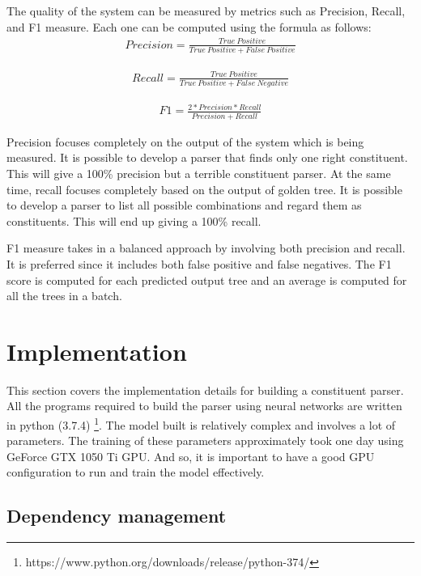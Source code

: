 \documentclass[a4paper, 11pt]{article}
\begin{document}
The quality of the system can be measured by metrics such as Precision, Recall, and F1 measure. Each one can be computed using the formula as follows:
\begin{align*}
Precision = \frac{True\ Positive} {True\ Positive + False\ Positive}
\end{align*}

\begin{align*}
Recall = \frac{True\ Positive} {True\ Positive + False\ Negative}
\end{align*}

\begin{align*}
F1 = \frac{2* Precision * Recall} {Precision + Recall}
\end{align*}

Precision focuses completely on the output of the system which is being measured. It is possible to develop a parser that finds only one right constituent. This will give a 100\% precision but a terrible constituent parser. At the same time, recall focuses completely based on the output of golden tree. It is possible to develop a parser to list all possible combinations and regard them as constituents. This will end up giving a 100\% recall.

F1 measure takes in a balanced approach by involving both precision and recall. It is preferred since it includes both false positive and false negatives. The F1 score is computed for each predicted output tree and an average is computed for all the trees in a batch. 


\pagebreak
\section{Implementation}

This section covers the implementation details for building a constituent parser. All the programs required to build the parser using neural networks are written in python (3.7.4) \footnote{https://www.python.org/downloads/release/python-374/}. The model built is relatively complex and involves a lot of parameters. The training of these parameters approximately took one day using GeForce GTX 1050 Ti GPU. And so, it is important to have a good GPU configuration to run and train the model effectively. 
\subsection{Dependency management}
\end{document}
